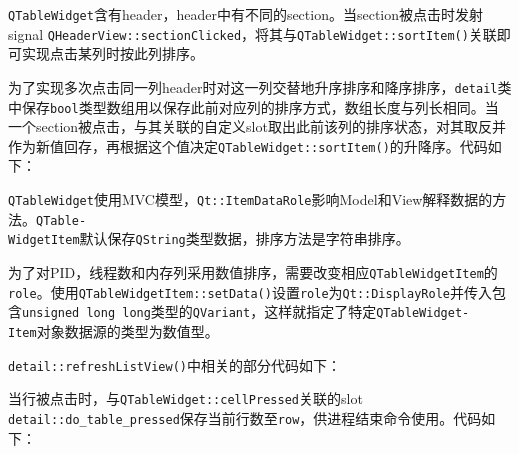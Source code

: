 \documentclass{beamer}
\newcommand\code[1]{\texttt{#1}}
\begin{document}
\begin{frame}
    \code{QTableWidget}含有header，header中有不同的section。当section被点击时发射signal \code{QHeaderView::sectionClicked}，将其与\code{QTableWidget::sortItem()}关联即可实现点击某列时按此列排序。

为了实现多次点击同一列header时对这一列交替地升序排序和降序排序，\code{detail}类中保存\code{bool}类型数组用以保存此前对应列的排序方式，数组长度与列长相同。当一个section被点击，与其关联的自定义slot取出此前该列的排序状态，对其取反并作为新值回存，再根据这个值决定\code{QTableWidget::sortItem()}的升降序。代码如下：
\end{frame}

\begin{frame}
    
{
    \ttfamily
    
}
\end{frame}

\begin{frame}
    \code{QTableWidget}使用MVC模型，\code{Qt::ItemDataRole}影响Model和View解释数据的方法。\code{QTable-\\WidgetItem}默认保存\code{QString}类型数据，排序方法是字符串排序。

为了对PID，线程数和内存列采用数值排序，需要改变相应\code{QTableWidgetItem}的\code{role}。使用\code{QTableWidgetItem::setData()}设置\code{role}为\code{Qt::DisplayRole}并传入包含\code{unsigned long long}类型的\code{QVariant}，这样就指定了特定\code{QTableWidget-\\Item}对象数据源的类型为数值型。

\code{detail::refreshListView()}中相关的部分代码如下：

{
    \ttfamily
    
}
\end{frame}

\begin{frame}
    
当行被点击时，与\code{QTableWidget::cellPressed}关联的slot \code{detail::do\_table\_pressed}保存当前行数至\code{row}，供进程结束命令使用。代码如下：

{
    \ttfamily
    
}

\end{frame}
\end{document}

